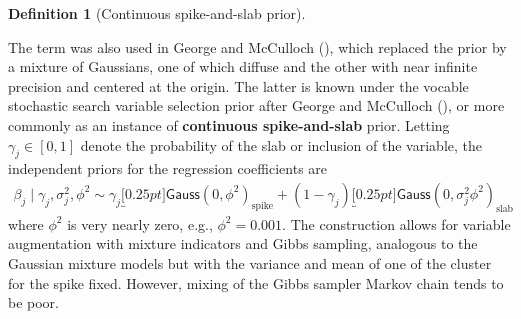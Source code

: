 \documentclass[
  11pt,
  letterpaper,
]{scrbook}
\theoremstyle{definition}
\newtheorem{definition}{Definition}[chapter]
\theoremstyle{plain}
\theoremstyle{plain}
\theoremstyle{plain}
\theoremstyle{definition}
\theoremstyle{definition}
\theoremstyle{remark}
\begin{document}
\begin{definition}[Continuous spike-and-slab
prior]\protect\hypertarget{def-cont-spike-slab}{}\label{def-cont-spike-slab}

The term was also used in George and McCulloch
(), which replaced the prior
by a mixture of Gaussians, one of which diffuse and the other with near
infinite precision and centered at the origin. The latter is known under
the vocable stochastic search variable selection prior after George and
McCulloch (), or more commonly
as an instance of \textbf{continuous spike-and-slab} prior. Letting
\(\gamma_j \in [0,1]\) denote the probability of the slab or inclusion
of the variable, the independent priors for the regression coefficients
are \begin{align*}
 \beta_j \mid \gamma_j, \sigma_j^2, \phi^2 \sim  \gamma_j \underbracket[0.25pt]{\mathsf{Gauss}(0, \phi^2)}_{\text{spike}} + (1-\gamma_j) \underbracket[0.25pt]{\mathsf{Gauss}(0, \sigma_j^2\phi^2)}_{\text{slab}}
\end{align*} where \(\phi^2\) is very nearly zero, e.g.,
\(\phi^2=0.001.\) The construction allows for variable augmentation with
mixture indicators and Gibbs sampling, analogous to the Gaussian mixture
models but with the variance and mean of one of the cluster for the
spike fixed. However, mixing of the Gibbs sampler Markov chain tends to
be poor.

\end{definition}
\end{document}
